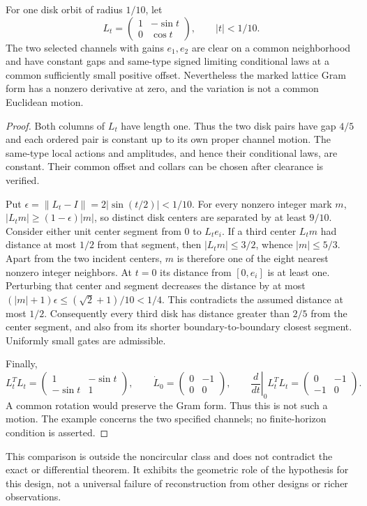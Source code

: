 \begin{proposition}
\label{prop:v49-circular-comparison}
For one disk orbit of radius $1/10$, let
\[
 L_t=\begin{pmatrix}1&-\sin t\\0&\cos t\end{pmatrix},
                         \qquad |t|<1/10.
\]
The two selected channels with gains $e_1,e_2$ are clear on a common
neighborhood and have constant gaps and same-type signed limiting
conditional laws at a common sufficiently small positive offset.
Nevertheless the marked lattice Gram form has a nonzero derivative
at zero, and the variation is not a common Euclidean motion.
\end{proposition}
\begin{proof}
Both columns of $L_t$ have length one.  Thus the two disk pairs have
gap $4/5$ and each ordered pair is constant up to its own proper
channel motion.  The same-type local actions and amplitudes, and hence
their conditional laws, are constant.  Their common offset and collars
can be chosen after clearance is verified.

Put $\epsilon=\|L_t-I\|=2|\sin(t/2)|<1/10$.
For every nonzero integer mark $m$, $|L_tm|\ge(1-\epsilon)|m|$,
so distinct disk centers are separated by at least $9/10$.
Consider either unit center segment from $0$ to $L_te_i$.
If a third center $L_tm$ had distance at most $1/2$ from that segment,
then $|L_tm|\le3/2$, whence $|m|\le5/3$.  Apart from the two incident
centers, $m$ is therefore one of the eight nearest nonzero integer
neighbors.  At $t=0$ its distance from $[0,e_i]$ is at least one.
Perturbing that center and segment decreases the distance by at most
$(|m|+1)\epsilon\le(\sqrt2+1)/10<1/4$.
This contradicts the assumed distance at most $1/2$.
Consequently every third disk has distance greater than $2/5$ from
the center segment, and also from its shorter boundary-to-boundary
closest segment.  Uniformly small gates are admissible.

Finally,
\[
 L_t^TL_t=\begin{pmatrix}1&-\sin t\\-\sin t&1\end{pmatrix},
 \qquad
 \dot L_0=\begin{pmatrix}0&-1\\0&0\end{pmatrix},\qquad
 \left.\frac{d}{dt}\right|_0 L_t^TL_t=
                \begin{pmatrix}0&-1\\-1&0\end{pmatrix}.
\]
A common rotation would preserve the Gram form.  Thus this is not
such a motion.  The example concerns the two specified channels;
no finite-horizon condition is asserted.
\end{proof}

This comparison is outside the noncircular class and does not contradict
the exact or differential theorem.  It exhibits the geometric role of
the hypothesis for this design, not a universal failure of reconstruction
from other designs or richer observations.

